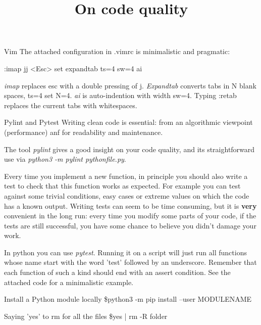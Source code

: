 \documentclass[10pt]{article}
\title {On code quality}
\begin{document}
\maketitle

\begin{section}{Vim}
The attached configuration in .vimrc is minimalistic and pragmatic:


:imap jj <Esc>
set expandtab ts=4 sw=4 ai


\emph{imap} replaces esc with a double pressing of j.
\emph{Expandtab} converts tabs in N blank spaces, ts=4 set N=4.
\emph{ai} is auto-indention with width sw=4.
Typing :retab replaces the current tabs
with whitespaces.
\end{section}


\begin{section}{Pylint and Pytest}
Writing clean code is essential: from an algorithmic viewpoint 
(performance) anf for readability and maintenance.


The tool \emph{pylint} gives a good insight on your code quality,
and its straightforward use via \emph{python3 -m pylint pythonfile.py}.


Every time you implement a new function, 
in principle you should also
write a test to check that this function works as expected.
For example you can test against some trivial conditions, easy
cases or extreme values on which the code has a known output.
Writing tests can seem to be time consuming, but it is
\textbf{very} 
convenient in the long run: every time you modify some parts of your code,
if the tests are still successful, you have some chance to believe you didn't
damage your work.


In python you can use \emph{pytest}. Running it on a script will just run
all functions whose name start with the word 'test' followed by an underscore.
Remember that each function of such a kind should end with an assert condition.
See the attached code for a minimalistic example.
\end{section}

\begin{section}{Install a Python module locally}
\$python3 -m pip install --user MODULENAME
\end{section}

\begin{section}{Saying 'yes' to rm for all the files}
\$yes | rm -R folder
\end{section}
\end{document}
